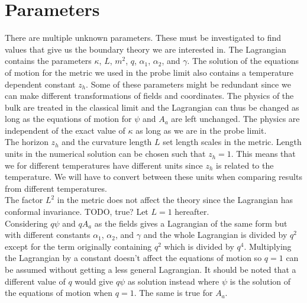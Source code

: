 \documentclass[12pt]{report}
\begin{document}
\section{Parameters}
There are multiple unknown parameters. These must be investigated to find values that give us the boundary theory we are interested in. The Lagrangian contains the parameters $\kappa$, $L$, $m^2$, $q$, $\alpha_1$, $\alpha_2$, and $\gamma$. The solution of the equations of motion for the metric we used in the probe limit also contains a temperature dependent constant $z_h$. Some of these parameters might be redundant since we can make different transformations of fields and coordinates. The physics of the bulk are treated in the classical limit and the Lagrangian can thus be changed as long as the equations of motion for $\psi$ and $A_a$ are left unchanged. The physics are independent of the exact value of $\kappa$ as long as we are in the probe limit.\\

The horizon $z_h$ and the curvature length $L$ set length scales in the metric. Length units in the numerical solution can be chosen such that $z_h=1$. This means that we for different temperatures have different units since $z_h$ is related to the temperature. We will have to convert between these units when comparing results from different temperatures.\\

The factor $L^2$ in the metric does not affect the theory since the Lagrangian has conformal invariance. TODO, true? Let $L=1$ hereafter.\\

Considering $q\psi$ and $qA_a$ as the fields gives a Lagrangian of the same form but with different constants $\alpha_1$, $\alpha_2$, and $\gamma$ and the whole Lagrangian is divided by $q^2$ except for the term originally containing $q^2$ which is divided by $q^4$. Multiplying the Lagrangian by a constant doesn't affect the equations of motion so $q=1$ can be assumed without getting a less general Lagrangian. It should be noted that a different value of $q$ would give $q\psi$ as solution instead where $\psi$ is the solution of the equations of motion when $q=1$. The same is true for $A_a$.\\
\end{document}
